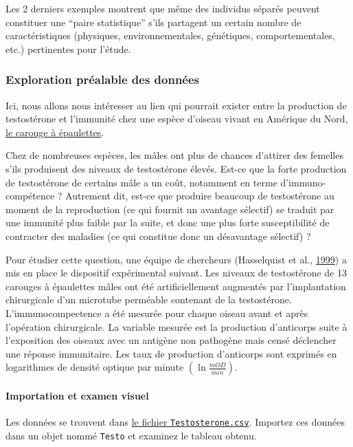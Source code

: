 \documentclass[a4paperpaper,]{article}
\let\oldparagraph\paragraph
\renewcommand{\paragraph}[1]{\oldparagraph{#1}\mbox{}}
\begin{document}
Les 2 derniers exemples montrent que même des individus séparés peuvent constituer une ``paire statistique'' s'ils partagent un certain nombre de caractéristiques (physiques, environnementales, génétiques, comportementales, etc.) pertinentes pour l'étude.

\hypertarget{Explo2}{%
\subsubsection{Exploration préalable des données}\label{Explo2}}

Ici, nous allons nous intéresser au lien qui pourrait exister entre la production de testostérone et l'immunité chez une espèce d'oiseau vivant en Amérique du Nord, \href{https://fr.wikipedia.org/wiki/Carouge_à_épaulettes}{le carouge à épaulettes}.

Chez de nombreuses espèces, les mâles ont plus de chances d'attirer des femelles s'ils produisent des niveaux de testostérone élevés. Est-ce que la forte production de testostérone de certains mâle a un coût, notamment en terme d'immuno-compétence ? Autrement dit, est-ce que produire beaucoup de testostérone au moment de la reproduction (ce qui fournit un avantage sélectif) se traduit par une immunité plus faible par la suite, et donc une plus forte susceptibilité de contracter des maladies (ce qui constitue donc un désavantage sélectif) ?

Pour étudier cette question, une équipe de chercheurs (Hasselquist et al., \protect\hyperlink{ref-Hasselquist1999}{1999}) a mis en place le dispositif expérimental suivant. Les niveaux de testostérone de 13 carouges à épaulettes mâles ont été artificiellement augmentés par l'implantation chirurgicale d'un microtube perméable contenant de la testostérone. L'immunocompeetence a été mesurée pour chaque oiseau avant et après l'opération chirurgicale. La variable mesurée est la production d'anticorps suite à l'exposition des oiseaux avec un antigène non pathogène mais censé déclencher une réponse immunitaire. Les taux de production d'anticorps sont exprimés en logarithmes de densité optique par minute \(\left(\ln\frac{mOD}{min}\right)\).

\hypertarget{importation-et-examen-visuel-1}{%
\paragraph{Importation et examen visuel}\label{importation-et-examen-visuel-1}}

Les données se trouvent dans \href{https://besibo.github.io/Biometrie3/data/Testosterone.csv}{le fichier \texttt{Testosterone.csv}}. Importez ces données dans un objet nommé \texttt{Testo} et examinez le tableau obtenu.
\end{document}
